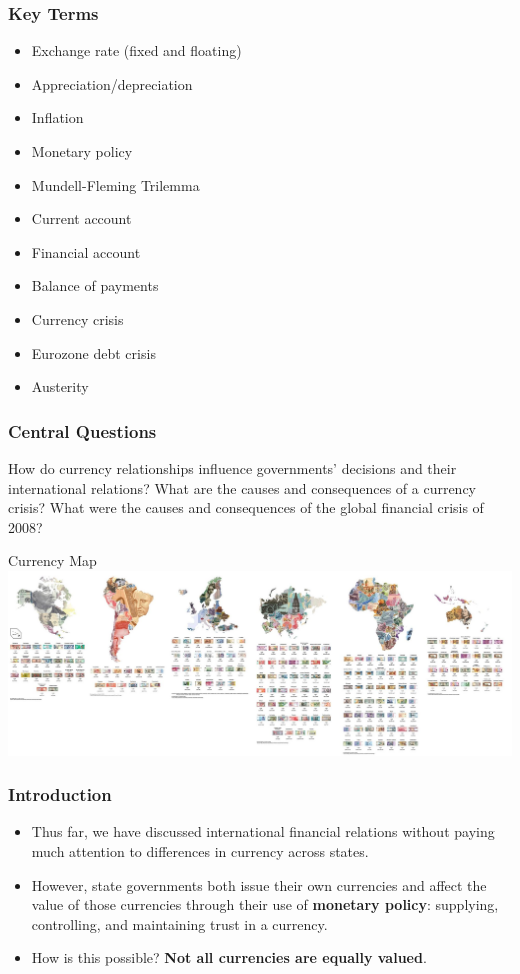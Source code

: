 \documentclass{beamer}
\begin{document}
\begin{frame} 
	\frametitle{\LARGE{Key Terms}}
	\begin{itemize}
		\item Exchange rate (fixed and floating)
		\item Appreciation/depreciation
		\item Inflation
		\item Monetary policy
		\item Mundell-Fleming Trilemma
		\item Current account
		\item Financial account
		\item Balance of payments
		\item Currency crisis
		\item Eurozone debt crisis
		\item Austerity
	\end{itemize}
\end{frame}


\begin{frame} 
\frametitle{\LARGE{Central Questions}}
\centering
\Large{How do currency relationships influence governments' decisions and their international relations? What are the causes and consequences of a currency crisis? What were the causes and consequences of the global financial crisis of 2008?}
\end{frame}

\begin{frame}{\LARGE Currency Map}
    \centering
\includegraphics[width=\textwidth,height=0.8\textheight,keepaspectratio]{currency map.JPG}
\end{frame}

\begin{frame} 
	\frametitle{\LARGE{Introduction}}
	\begin{itemize}
			\item Thus far, we have discussed international financial relations without paying much attention to differences in currency across states. \pause
			\item However, state governments both issue their own currencies and affect the value of those currencies through their use of \textbf{monetary policy}:  supplying, controlling, and maintaining trust in a currency. \pause
			\item How is this possible? \textbf{Not all currencies are equally valued}.				
	\end{itemize}
\end{frame}
\end{document}
